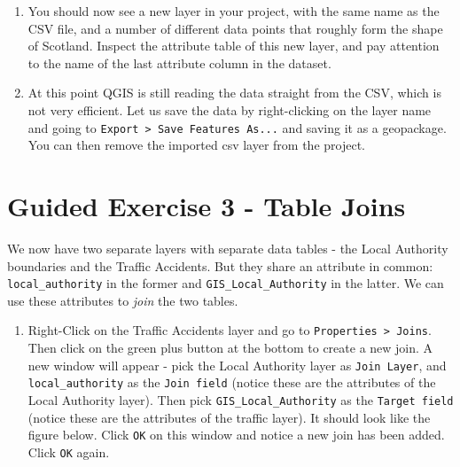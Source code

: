 \documentclass[
  letterpaper,
  DIV=11,
  numbers=noendperiod]{scrreprt}
\providecommand{\tightlist}{%
  \setlength{\itemsep}{0pt}\setlength{\parskip}{0pt}}\usepackage{longtable,booktabs,array}
\begin{document}
\begin{enumerate}
\def\labelenumi{(\arabic{enumi})}
\setcounter{enumi}{310}
\item
  You should now see a new layer in your project, with the same name as
  the CSV file, and a number of different data points that roughly form
  the shape of Scotland. Inspect the attribute table of this new layer,
  and pay attention to the name of the last attribute column in the
  dataset.
\item
  At this point QGIS is still reading the data straight from the CSV,
  which is not very efficient. Let us save the data by right-clicking on
  the layer name and going to
  \texttt{Export\ \textgreater{}\ Save\ Features\ As...} and saving it
  as a geopackage. You can then remove the imported csv layer from the
  project.
\end{enumerate}

\section{Guided Exercise 3 - Table
Joins}\label{guided-exercise-3---table-joins}

We now have two separate layers with separate data tables - the Local
Authority boundaries and the Traffic Accidents. But they share an
attribute in common: \texttt{local\_authority} in the former and
\texttt{GIS\_Local\_Authority} in the latter. We can use these
attributes to \emph{join} the two tables.

\begin{enumerate}
\def\labelenumi{(\arabic{enumi})}
\setcounter{enumi}{312}
\tightlist
\item
  Right-Click on the Traffic Accidents layer and go to
  \texttt{Properties\ \textgreater{}\ Joins}. Then click on the green
  plus button at the bottom to create a new join. A new window will
  appear - pick the Local Authority layer as \texttt{Join\ Layer}, and
  \texttt{local\_authority} as the \texttt{Join\ field} (notice these
  are the attributes of the Local Authority layer). Then pick
  \texttt{GIS\_Local\_Authority} as the \texttt{Target\ field} (notice
  these are the attributes of the traffic layer). It should look like
  the figure below. Click \texttt{OK} on this window and notice a new
  join has been added. Click \texttt{OK} again.
\end{enumerate}
\end{document}
